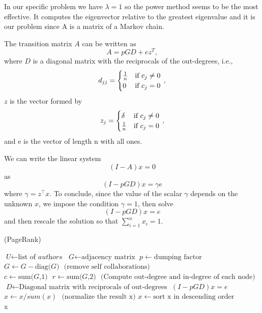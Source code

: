 \documentclass[]{usiinfbachelorproject}
\newcommand\transp[1]{{#1}^{\top}}
\begin{document}
In our specific problem we have $\lambda = 1$ so the power method seems to be the most effective. It computes the eigenvector relative to the greatest eigenvalue and it is our problem since A is a matrix of a Markov chain.

The transition matrix $A$ can be written as
$$A = pGD+ez^{T}, $$
where $D$ is a diagonal matrix with the reciprocals of the out-degrees, i.e.,
\begin{equation}\notag
d_{jj} = 
\begin{cases}
\frac{1}{n} & \text{if } c_{j} \neq 0\\
0 & \text{if } c_{j} = 0
\end{cases} \,,
\end{equation}
$z$ is the vector formed by
\begin{equation}\notag
z_{j} = 
\begin{cases}
\delta & \text{if } c_{j} \neq 0\\
\frac{1}{n} & \text{if } c_{j} = 0
\end{cases} \,,
\end{equation}
and e is the vector of length n with all ones.

We can write the linear system
$$(I-A)x=0$$
as
$$(I - pGD)x = \gamma e$$
where $\gamma = \transp{z}x$.
To conclude, since the value of the scalar $\gamma$ depends on the unknown $x$, we impose the condition $\gamma = 1$, then solve
\begin{equation}
(I - pGD)x = e
\end{equation}
and then rescale the solution so that $\sum\limits_{i=1}^{n} x_i = 1$.

\begin{algorithm}
\caption{ (PageRank)}\label{pagerank}
\begin{algorithmic}[1]
\State $\textit{U} \gets \text{list of }\textit{authors}$
\State $\textit{G} \gets \text{adjacency matrix}$
\State $p \gets \text{dumping factor}$
\State $\textit{G} \gets \textit{G} - \text{diag(}\textit{G}\text{)} \: \: \: \text{(remove self collaborations)}$
\State $\textit{c} \gets \text{sum(}\textit{G}\text{,1)} \:\:\: \textit{r} \gets \text{sum(}\textit{G}\text{,2)} \:\:\: \text{(Compute out-degree and in-degree of each node)}$
\State $\textit{D} \gets \text{Diagonal matrix with reciprocals of out-degrees}$
\State $(I - pGD)x = e$
\State $x \gets x / sum(x) \: \:\: \text{(normalize the result x)}$
\State $x \gets \text{sort x in descending order}$\\
\Return x
\EndProcedure
\end{algorithmic}
\end{algorithm}
\end{document}
